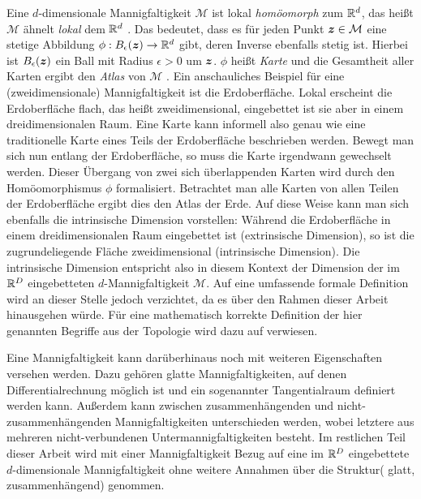 Eine $d$-dimensionale Mannigfaltigkeit $\mathcal{M}$ ist lokal \textit{homöomorph} zum $\mathbb{R}^d$,
das heißt $\mathcal{M}$ ähnelt \textit{lokal} dem $\mathbb{R}^d$ \parencite[3]{Lee.2011}. Das bedeutet, dass es für jeden Punkt $\bm{z} \in \mathcal{M}$ eine stetige
Abbildung $\phi: B_\epsilon(\bm{z}) \rightarrow \mathbb{R}^d$ gibt, deren Inverse ebenfalls stetig
ist. Hierbei ist $B_\epsilon(\bm{z})$ ein Ball mit Radius $\epsilon > 0$ um $\bm{z}$. $\phi$
heißt \textit{Karte} und die Gesamtheit aller Karten ergibt den \textit{Atlas} von $\mathcal{M}$ \parencite[4]{Cayton.2005}. Ein anschauliches Beispiel für eine (zweidimensionale) Mannigfaltigkeit ist
die Erdoberfläche. Lokal erscheint die Erdoberfläche flach, das heißt zweidimensional, eingebettet
ist sie aber in einem dreidimensionalen Raum. Eine Karte kann informell also genau wie eine
traditionelle Karte eines Teils der Erdoberfläche beschrieben werden. Bewegt man sich nun entlang
der Erdoberfläche, so muss die Karte irgendwann gewechselt werden. Dieser Übergang von zwei sich
überlappenden Karten wird durch den Homöomorphismus $\phi$ formalisiert. Betrachtet man alle Karten
von allen Teilen der Erdoberfläche ergibt dies den Atlas der Erde. Auf diese Weise kann man sich
ebenfalls die intrinsische Dimension vorstellen: Während die Erdoberfläche in einem
dreidimensionalen Raum eingebettet ist (extrinsische Dimension), so ist die zugrundeliegende Fläche
zweidimensional (intrinsische Dimension). Die intrinsische Dimension entspricht also in diesem
Kontext der Dimension der im $\mathbb{R}^D$ eingebetteten $d$-Mannigfaltigkeit $\mathcal{M}$. Auf eine
umfassende formale Definition wird an dieser Stelle jedoch verzichtet, da es über den Rahmen dieser
Arbeit hinausgehen würde. Für eine mathematisch korrekte Definition der hier genannten Begriffe aus
der Topologie wird dazu auf \textcites{Lee.2011}{Lee.2012} verwiesen.

Eine Mannigfaltigkeit kann darüberhinaus noch mit weiteren Eigenschaften versehen werden. Dazu
gehören glatte Mannigfaltigkeiten, auf denen Differentialrechnung möglich ist und ein sogenannter
Tangentialraum definiert werden kann. Außerdem kann zwischen zusammenhängenden und
nicht-zusammenhängenden Mannigfaltigkeiten unterschieden werden, wobei letztere aus mehreren
nicht-verbundenen Untermannigfaltigkeiten besteht. Im restlichen Teil dieser Arbeit wird mit einer
Mannigfaltigkeit Bezug auf eine im $\mathbb{R}^D$ eingebettete $d$-dimensionale Mannigfaltigkeit ohne
weitere Annahmen über die Struktur( glatt, zusammenhängend) genommen.

